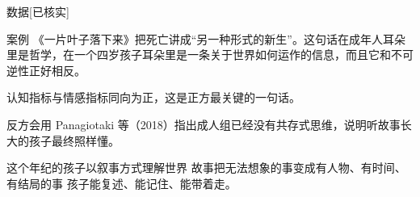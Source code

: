 \documentclass[prep,both]{debate}
\begin{document}
\begin{fields}
\begin{evidence}{数据}[已核实]
\end{evidence}
\begin{evidence}{案例}
《一片叶子落下来》把死亡讲成“另一种形式的新生”。这句话在成年人耳朵里是哲学，在一个四岁孩子耳朵里是一条关于世界如何运作的信息，而且它和不可逆性正好相反。
\end{evidence}
\closing[回扣判准]{认知指标与情感指标同向为正，这是正方最关键的一句话。}
\begin{clash}
反方会用 Panagiotaki 等（2018）指出成人组已经没有共存式思维，说明听故事长大的孩子最终照样懂。
\end{clash}
\end{fields}
\begin{fields}
\begin{mechanism}[机制]
\step 这个年纪的孩子以叙事方式理解世界
\step 故事把无法想象的事变成有人物、有时间、有结局的事
\step 孩子能复述、能记住、能带着走。


\end{mechanism}
\end{fields}
\end{document}
